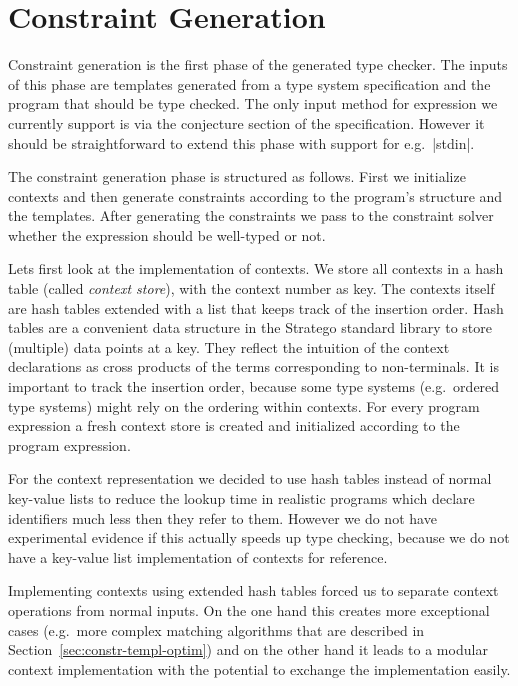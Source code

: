 \section{Constraint Generation}
\label{sec:constr-gener}
Constraint generation is the first phase of the generated type
checker. The inputs of this phase are templates generated from a type
system specification and the program that should be type checked. The
only input method for expression we currently support is via the
conjecture section of the specification. However it should be
straightforward to extend this phase with support for e.g.\
\code|stdin|.

The constraint generation phase is structured as follows. First we
initialize contexts and then generate constraints according to the
program's structure and the templates. After generating the
constraints we pass to the constraint solver whether the expression
should be well-typed or not.

Lets first look at the implementation of contexts. We store all
contexts in a hash table (called \emph{context store}), with the
context number as key. The contexts itself are hash tables extended
with a list that keeps track of the insertion order. Hash tables are a
convenient data structure in the Stratego standard library to store
(multiple) data points at a key. They reflect the intuition of the
context declarations as cross products of the terms corresponding to
non-terminals. It is important to track the insertion order, because
some type systems (e.g.\ ordered type systems) might rely on the
ordering within contexts. For every program expression a fresh context
store is created and initialized according to the program expression.

For the context representation we decided to use hash tables instead
of normal key-value lists to reduce the lookup time in realistic
programs which declare identifiers much less then they refer to
them. However we do not have experimental evidence if this actually
speeds up type checking, because we do not have a key-value list
implementation of contexts for reference.

Implementing contexts using extended hash tables forced us to separate
context operations from normal inputs. On the one hand this creates
more exceptional cases (e.g.\ more complex matching algorithms that
are described in Section~\ref{sec:constr-templ-optim}) and on the
other hand it leads to a modular context implementation with the
potential to exchange the implementation easily.

